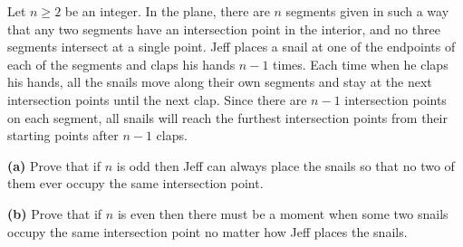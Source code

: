 Let $n \geq 2$ be an integer. In the plane, there are $n$ segments given in such a way that any two segments have an intersection point in the interior, and no three segments intersect at a single point. Jeff places a snail at one of the endpoints of each of the segments and claps his hands $n-1$ times. Each time when he claps his hands, all the snails move along their own segments and stay at the next intersection points until the next clap. Since there are $n-1$ intersection points on each segment, all snails will reach the furthest intersection points from their starting points after $n-1$ claps.

\textbf{(a)} Prove that if $n$ is odd then Jeff can always place the snails so that no two of them ever occupy the same intersection point.

\textbf{(b)} Prove that if $n$ is even then there must be a moment when some two snails occupy the same intersection point no matter how Jeff places the snails.
